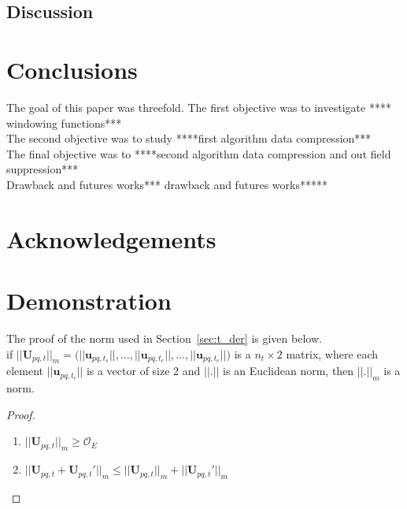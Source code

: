 \documentclass[useAMS,usenatbib]{mn2e}
\begin{document}
\subsection{Discussion}
\section{Conclusions}
The goal of this paper was threefold. The first objective was to investigate **** windowing functions***\\
The second objective  was to study ****first algorithm data compression***\\
The final objective was to ****second algorithm data compression and out field suppression*** \\
Drawback and futures works*** drawback and futures works*****

\section*{Acknowledgements}


\appendix
\section[]{Demonstration}
The proof of the norm used in Section~\ref{sec:t_der} is given below.\\
if $||\textbf{U}_{pq,t}||_{m}=\Bigg(||\mathbf{u}_{pq,t_s}||, \dots , ||\mathbf{u}_{pq,t_c}||, \dots, ||\mathbf{u}_{pq,t_e}||\Bigg)$ is a 
$n_t\times2$ matrix, where each element $||\mathbf{u}_{pq,t_i}||$ is a vector of size 2 and $||.||$ is an Euclidean norm, then $||.||_{m}$ 
is a norm.
\begin{proof}
\begin{enumerate}
 \item $||\mathbf{U}_{pq,t}||_{m}\geq \mathcal{O}_{E}$
 \item $||\mathbf{U}_{pq,t}+\mathbf{U}_{pq,t}'||_{m} \leq ||\mathbf{U}_{pq,t}||_{m} + ||\mathbf{U}_{pq,t}'||_{m}$
\end{enumerate}
\end{proof}
\bsp
\label{lastpage}
\end{document}
